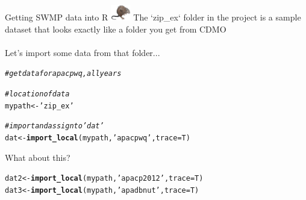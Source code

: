 \documentclass[xcolor=dvipsnames]{beamer}\usepackage[]{graphicx}\usepackage[]{color}
\makeatletter
\newcommand{\hlstr}[1]{\textcolor[rgb]{0.192,0.494,0.8}{#1}}%
\newcommand{\hlcom}[1]{\textcolor[rgb]{0.678,0.584,0.686}{\textit{#1}}}%
\newcommand{\hlstd}[1]{\textcolor[rgb]{0.345,0.345,0.345}{#1}}%
\newcommand{\hlkwb}[1]{\textcolor[rgb]{0.69,0.353,0.396}{#1}}%
\newcommand{\hlkwc}[1]{\textcolor[rgb]{0.333,0.667,0.333}{#1}}%
\newcommand{\hlkwd}[1]{\textcolor[rgb]{0.737,0.353,0.396}{\textbf{#1}}}%
\newenvironment{kframe}{%
 \def\at@end@of@kframe{}%
 \ifinner\ifhmode%
  \def\at@end@of@kframe{\end{minipage}}%
  \begin{minipage}{\columnwidth}%
 \fi\fi%
 \def\FrameCommand##1{\hskip\@totalleftmargin \hskip-\fboxsep
 \colorbox{shadecolor}{##1}\hskip-\fboxsep
     \hskip-\linewidth \hskip-\@totalleftmargin \hskip\columnwidth}%
 \MakeFramed {\advance\hsize-\width
   \@totalleftmargin\z@ \linewidth\hsize
   \@setminipage}}%
 {\par\unskip\endMakeFramed%
 \at@end@of@kframe}
\newenvironment{knitrout}{}{} %
\makeatother
\begin{document}
\begin{frame}[fragile]{Getting SWMP data into R \includegraphics[width = 0.065\textwidth]{imgs/swmprat.png}}
\onslide<+->
The `zip\_ex` folder in the project is a sample dataset that looks exactly like a folder you get from CDMO \\~\\
Let's import some data from that folder...
\begin{knitrout}\scriptsize
{}\color{fgcolor}\begin{kframe}
\begin{alltt}
\hlcom{# get data for apacpwq, all years}

\hlcom{# location of data}
\hlstd{mypath} \hlkwb{<-} \hlstr{'zip_ex'}

\hlcom{# import and assign to 'dat'}
\hlstd{dat} \hlkwb{<-} \hlkwd{import_local}\hlstd{(mypath,} \hlstr{'apacpwq'}\hlstd{,} \hlkwc{trace} \hlstd{= T)}
\end{alltt}
\end{kframe}
\end{knitrout}
\onslide<+->
What about this?
\begin{knitrout}\scriptsize
{}\color{fgcolor}\begin{kframe}
\begin{alltt}
\hlstd{dat2} \hlkwb{<-} \hlkwd{import_local}\hlstd{(mypath,} \hlstr{'apacp2012'}\hlstd{,} \hlkwc{trace} \hlstd{= T)}
\hlstd{dat3} \hlkwb{<-} \hlkwd{import_local}\hlstd{(mypath,} \hlstr{'apadbnut'}\hlstd{,} \hlkwc{trace} \hlstd{= T)}
\end{alltt}
\end{kframe}
\end{knitrout}

\end{frame}
\end{document}
